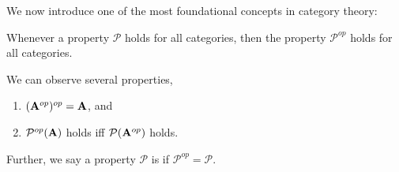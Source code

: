 We now introduce one of the most foundational concepts in
category theory:

\begin{framed}
\begin{duality-principle}
\label{dualityPrinciple}
Whenever a property $\mathcal{P}$ holds for all categories, then
the property $\mathcal{P}^{op}$ holds for all categories.
\end{duality-principle}
\end{framed}

We can observe several properties,
\begin{enumerate}
\item $(\mathbf{A}^{op})^{op}=\mathbf{A}$, and
\item $\mathcal{P}^{op}(\mathbf{A})$ holds iff $\mathcal{P}(\mathbf{A}^{op})$ holds.
\end{enumerate}
Further, we say a property $\mathcal{P}$ is  if
$\mathcal{P}^{op}=\mathcal{P}$.
